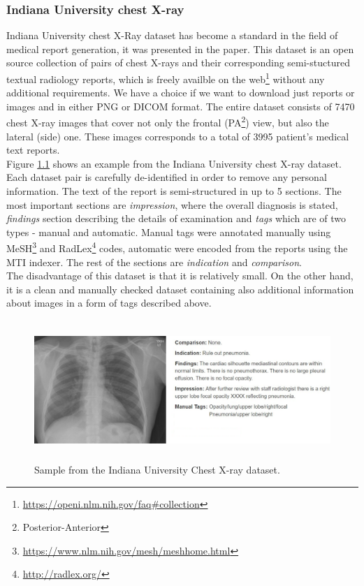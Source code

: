 \subsubsection{Indiana University chest X-ray}
\label{sec:IUDataset}
Indiana University chest X-Ray dataset has become a standard in the field of medical report generation, it was presented in the \citet{10.1093/jamia/ocv080} paper. This dataset is an open source collection of pairs of chest X-rays and their corresponding semi-stuctured textual radiology reports, which is freely availble on the web\footnote[1]{\url{https://openi.nlm.nih.gov/faq\#collection}} without any additional requirements. We have a choice if we want to download just reports or images and in either PNG or DICOM format. The entire dataset consists of 7470 chest X-ray images that cover not only the frontal (PA\footnote[1]{Posterior-Anterior}) view, but also the lateral (side) one. These images corresponds to a total of 3995 patient's medical text reports.\\

Figure \hyperref[fig01:IUChestXRaySample]{1.1} shows an example from the Indiana University chest X-ray dataset. Each dataset pair is carefully de-identified in order to remove any personal information. The text of the report is semi-structured in up to 5 sections. The most important sections are \textit{impression}, where the overall diagnosis is stated, \textit{findings} section describing the details of examination and \textit{tags} which are of two types - manual and automatic. Manual tags were annotated manually using MeSH\footnote[1]{\url{https://www.nlm.nih.gov/mesh/meshhome.html}} and RadLex\footnote[1]{\url{http://radlex.org/}} codes, automatic were encoded from the reports using the MTI indexer. The rest of the sections are \textit{indication} and \textit{comparison}.\\

The disadvantage of this dataset is that it is relatively small. On the other hand, it is a clean and manually checked dataset containing also additional information about images in a form of tags described above.

\begin{figure}[h]\centering
\includegraphics[width=145mm, height=53mm]{../img/IUChestXRaySample_CXR1728_IM-0479-1001}
\caption{Sample from the Indiana University Chest X-ray dataset.}
\label{fig01:IUChestXRaySample}
\end{figure}

